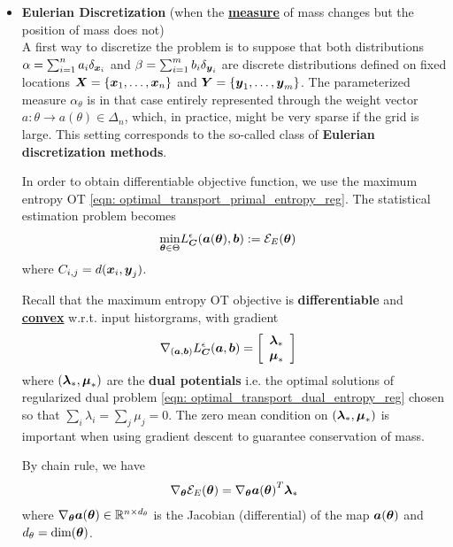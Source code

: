 \documentclass[11pt]{article}
\begin{document}
\begin{itemize}
\item \textbf{Eulerian Discretization} (when the \underline{\textbf{measure}} of mass changes but the position of mass does not)\\
A first way to discretize the problem is to suppose that both distributions  $\alpha = \sum_{i=1}^{n}a_i \delta_{\boldsymbol{x}_{i}}$ and $\beta = \sum_{i=1}^{m}b_i\delta_{\boldsymbol{y}_{i}}$ are discrete distributions defined on fixed locations $\boldsymbol{X} = \{\boldsymbol{x}_{1}, \ldots, \boldsymbol{x}_{n}\}$ and $\boldsymbol{Y} = \{\boldsymbol{y}_{1}, \ldots, \boldsymbol{y}_{m}\}$.  The parameterized measure $\alpha_{\theta}$ is in that case entirely represented through the weight vector $a: \theta \rightarrow a(\theta) \in \Delta_n$, which, in practice, might be very sparse if the grid is large. This setting corresponds to the so-called class of \textbf{Eulerian discretization methods}.

In order to obtain differentiable objective function, we use the maximum entropy OT \eqref{eqn: optimal_transport_primal_entropy_reg}. The statistical estimation problem becomes
\begin{align}
\min_{\boldsymbol{\theta} \in \Theta} & L_{\boldsymbol{C}}^{\epsilon}(\boldsymbol{a}(\boldsymbol{\theta}), \boldsymbol{b}) := {\mathcal E}_{E}(\boldsymbol{\theta}) \label{eqn: stats_estimation_max_ent_ot_eulerian}
\end{align} where $C_{i,j} = d(\boldsymbol{x}_{i}, \boldsymbol{y}_{j})$.

Recall that the maximum entropy OT objective is \textbf{differentiable} and \underline{\textbf{convex}} w.r.t. input historgrams, with gradient 
\begin{align}
\nabla_{(\boldsymbol{a}, \boldsymbol{b})}{L_{\boldsymbol{C}}^{\epsilon}(\boldsymbol{a}, \boldsymbol{b})} &= \left[\begin{array}{c}
\boldsymbol{\lambda}_{*} \\
\boldsymbol{\mu}_{*}
\end{array}\right] \label{eqn: grad_max_ot_historgram}
\end{align} where $(\boldsymbol{\lambda}_{*}, \boldsymbol{\mu}_{*})$ are the \textbf{dual potentials} i.e. the optimal solutions of regularized dual problem \eqref{eqn: optimal_transport_dual_entropy_reg} chosen so that $\sum_{i}\lambda_i = \sum_{j}\mu_j = 0 $. The zero mean condition on $(\boldsymbol{\lambda}_{*}, \boldsymbol{\mu}_{*})$ is important when using gradient descent to guarantee conservation of mass. 

By chain rule, we have
\begin{align}
\nabla_{\boldsymbol{\theta}}{{\mathcal E}_{E}(\boldsymbol{\theta})} = \nabla_{\boldsymbol{\theta}}{\boldsymbol{a}(\boldsymbol{\theta})}^{T}\boldsymbol{\lambda}_{*} \label{eqn: grad_loss_ruler}
\end{align} where $ \nabla_{\boldsymbol{\theta}}{\boldsymbol{a}(\boldsymbol{\theta})} \in {\mathbb R}^{n \times d_{\theta}}$ is the Jacobian (differential) of the map $\boldsymbol{a}(\boldsymbol{\theta})$ and $d_{\theta} = \text{dim}(\boldsymbol{\theta})$.


\end{itemize}
\end{document}
